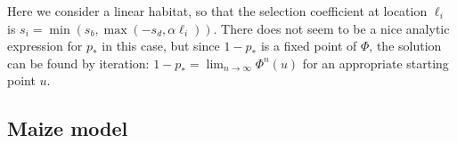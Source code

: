 
Here we consider a linear habitat, so that the selection coefficient at location $\ell_i$ is $s_i = \min( s_b, \max( - s_d, \alpha \ell_i ) )$.
There does not seem to be a nice analytic expression for $p_*$ in this case,
but since $1-p_*$ is a fixed point of $\Phi$, the solution can be found by iteration:
$1-p_* = \lim_{n \to \infty} \Phi^n(u)$ for an appropriate starting point $u$.

\subsection{Maize model}

